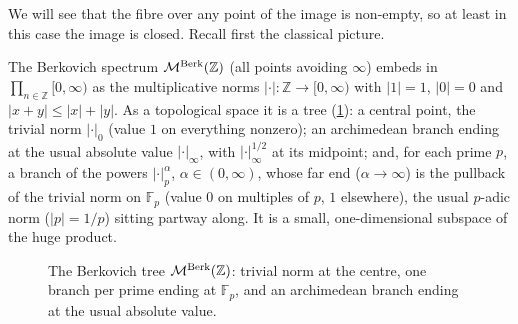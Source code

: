We will see that the fibre over any point of the image is non-empty, so at least
in this case the image is closed. Recall first the classical picture.

\begin{remark}
\label{rmk:22:MZ}
The Berkovich spectrum $\mathcal{M}^{\mathrm{Berk}}(\mathbb Z)$ (all points avoiding $\infty$)
embeds in $\prod_{n\in\mathbb Z}[0,\infty)$ as the multiplicative norms
$|\cdot|\colon\mathbb Z\to[0,\infty)$ with $|1|=1$, $|0|=0$ and $|x+y|\le
|x|+|y|$. As a topological space it is a tree
(\cref{fig:22:MZ}): a central point, the trivial norm $|\cdot|_0$ (value $1$ on
everything nonzero); an archimedean branch ending at the usual absolute value
$|\cdot|_\infty$, with $|\cdot|_\infty^{1/2}$ at its midpoint; and, for each
prime $p$, a branch of the powers $|\cdot|_p^{\alpha}$, $\alpha\in(0,\infty)$,
whose far end ($\alpha\to\infty$) is the pullback of the trivial norm on
$\mathbb F_p$ (value $0$ on multiples of $p$, $1$ elsewhere), the usual
$p$-adic norm ($|p|=1/p$) sitting partway along. It is a small,
one-dimensional subspace of the huge product.
\end{remark}

\begin{figure}[ht]
\centering
{}
\caption{The Berkovich tree $\mathcal{M}^{\mathrm{Berk}}(\mathbb Z)$: trivial norm at the centre, one
branch per prime ending at $\mathbb F_p$, and an archimedean branch ending at
the usual absolute value.}
\label{fig:22:MZ}
\end{figure}

